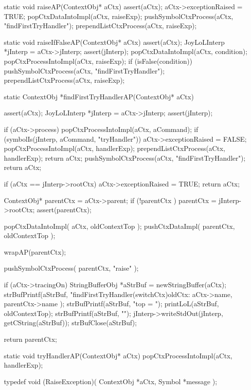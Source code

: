 \startCCode
static void raiseAP(ContextObj* aCtx) {
  assert(aCtx);
  aCtx->exceptionRaised = TRUE;
  popCtxDataIntoImpl(aCtx, raiseExp);
  pushSymbolCtxProcess(aCtx, "findFirstTryHandler");
  prependListCtxProcess(aCtx, raiseExp);
}
\stopCCode

\startCCode
static void raiseIfFalseAP(ContextObj* aCtx) {
  assert(aCtx);
  JoyLoLInterp *jInterp = aCtx->jInterp;
  assert(jInterp);
  popCtxDataIntoImpl(aCtx, condition);
  popCtxProcessIntoImpl(aCtx, raiseExp);
  if (isFalse(condition)) {
    pushSymbolCtxProcess(aCtx, "findFirstTryHandler");
    prependListCtxProcess(aCtx, raiseExp);
  }
}
\stopCCode

\startCCode
static ContextObj *findFirstTryHandlerAP(ContextObj* aCtx) {
  assert(aCtx);
  JoyLoLInterp *jInterp = aCtx->jInterp;
  assert(jInterp);

  if (aCtx->process) {
    popCtxProcessIntoImpl(aCtx, aCommand);
    if (symbolIs(jInterp, aCommand, "tryHandler")) {
      aCtx->exceptionRaised = FALSE;
      popCtxProcessIntoImpl(aCtx, handlerExp);
      prependListCtxProcess(aCtx, handlerExp);
      return aCtx;
    }
    pushSymbolCtxProcess(aCtx, "findFirstTryHandler");
    return aCtx;
  }

  if (aCtx == jInterp->rootCtx) {
    aCtx->exceptionRaised = TRUE;
    return aCtx;
  }
  
  ContextObj* parentCtx = aCtx->parent;
  if (!parentCtx ) parentCtx = jInterp->rootCtx;
  assert(parentCtx);
  
  popCtxDataIntoImpl(   aCtx,      oldContextTop );
  pushCtxDataImpl(      parentCtx, oldContextTop );
  
  wrapAP(parentCtx);
  
  pushSymbolCtxProcess( parentCtx, "raise"       );

  if (aCtx->tracingOn) {
    StringBufferObj *aStrBuf = newStringBuffer(aCtx);
    strBufPrintf(aStrBuf,
      "findFirstTryHandler(switchCtx)\n oldCtx: %
      aCtx->name, parentCtx->name
    );
    strBufPrintf(aStrBuf, "top = ");
    printLoL(aStrBuf, oldContextTop);
    strBufPrintf(aStrBuf, "\n");
    jInterp->writeStdOut(jInterp, getCString(aStrBuf));
    strBufClose(aStrBuf);
  }

  return parentCtx;
}
\stopCCode

\startCCode
static void tryHandlerAP(ContextObj* aCtx) {
  popCtxProcessIntoImpl(aCtx, handlerExp);
}
\stopCCode

\startCHeader
typedef void (RaiseException)(
  ContextObj *aCtx,
  Symbol     *message
);

